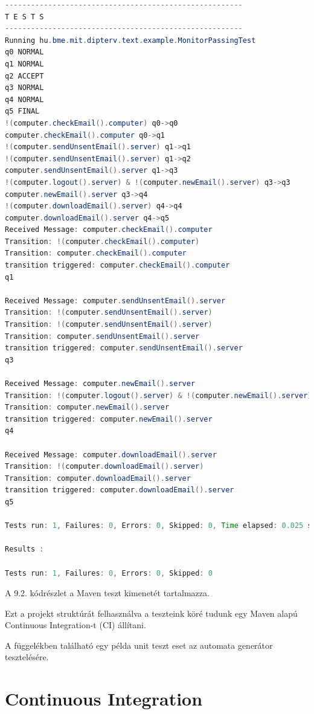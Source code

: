 \begin{lstlisting}[language=java, frame=single, float=ht!, caption={Integrációs teszteset eredménye.},captionpos=b]
-------------------------------------------------------
T E S T S
-------------------------------------------------------
Running hu.bme.mit.dipterv.text.example.MonitorPassingTest
q0 NORMAL
q1 NORMAL
q2 ACCEPT
q3 NORMAL
q4 NORMAL
q5 FINAL
!(computer.checkEmail().computer) q0->q0
computer.checkEmail().computer q0->q1
!(computer.sendUnsentEmail().server) q1->q1
!(computer.sendUnsentEmail().server) q1->q2
computer.sendUnsentEmail().server q1->q3
!(computer.logout().server) & !(computer.newEmail().server) q3->q3
computer.newEmail().server q3->q4
!(computer.downloadEmail().server) q4->q4
computer.downloadEmail().server q4->q5
Received Message: computer.checkEmail().computer
Transition: !(computer.checkEmail().computer)
Transition: computer.checkEmail().computer
transition triggered: computer.checkEmail().computer
q1

Received Message: computer.sendUnsentEmail().server
Transition: !(computer.sendUnsentEmail().server)
Transition: !(computer.sendUnsentEmail().server)
Transition: computer.sendUnsentEmail().server
transition triggered: computer.sendUnsentEmail().server
q3

Received Message: computer.newEmail().server
Transition: !(computer.logout().server) & !(computer.newEmail().server)
Transition: computer.newEmail().server
transition triggered: computer.newEmail().server
q4

Received Message: computer.downloadEmail().server
Transition: !(computer.downloadEmail().server)
Transition: computer.downloadEmail().server
transition triggered: computer.downloadEmail().server
q5

Tests run: 1, Failures: 0, Errors: 0, Skipped: 0, Time elapsed: 0.025 sec

Results :

Tests run: 1, Failures: 0, Errors: 0, Skipped: 0
\end{lstlisting}

A 9.2. kódrészlet a Maven teszt kimenetét tartalmazza.

Ezt a projekt struktúrát felhasználva a teszteink köré tudunk egy Maven alapú Continuous Integration-t (CI) állítani.

A függelékben található egy példa unit teszt eset az automata generátor tesztelésére.

\clearpage\section{Continuous Integration}


